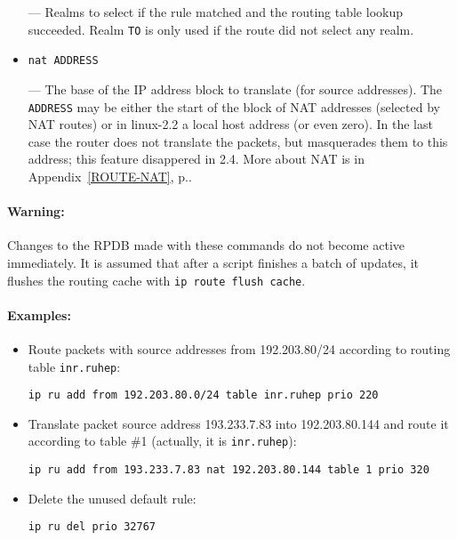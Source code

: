 \begin{itemize}
--- Realms to select if the rule matched and the routing table lookup
succeeded. Realm \verb|TO| is only used if the route did not select
any realm.

\item \verb|nat ADDRESS|

--- The base of the IP address block to translate (for source addresses).
The \verb|ADDRESS| may be either the start of the block of NAT addresses
(selected by NAT routes) or in linux-2.2 a local host address (or even zero).
In the last case the router does not translate the packets,
but masquerades them to this address; this feature disappered in 2.4.
More about NAT is in Appendix~\ref{ROUTE-NAT},
p.\pageref{ROUTE-NAT}.

\end{itemize}

\paragraph{Warning:} Changes to the RPDB made with these commands
do not become active immediately. It is assumed that after
a script finishes a batch of updates, it flushes the routing cache
with \verb|ip route flush cache|.

\paragraph{Examples:}
\begin{itemize}
\item Route packets with source addresses from 192.203.80/24
according to routing table \verb|inr.ruhep|:
\begin{verbatim}
ip ru add from 192.203.80.0/24 table inr.ruhep prio 220
\end{verbatim}

\item Translate packet source address 193.233.7.83 into 192.203.80.144
and route it according to table \#1 (actually, it is \verb|inr.ruhep|):
\begin{verbatim}
ip ru add from 193.233.7.83 nat 192.203.80.144 table 1 prio 320
\end{verbatim}

\item Delete the unused default rule:
\begin{verbatim}
ip ru del prio 32767
\end{verbatim}

\end{itemize}



